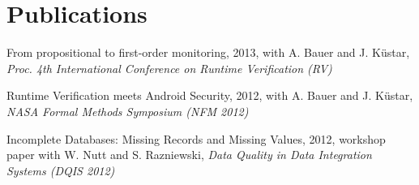 \documentclass[letterpaper]{article}
\renewenvironment{itemize}{
  \begin{list}{}{
    \setlength{\leftmargin}{1.5em}
  }
}{
  \end{list}
}
\begin{document}
\section*{Publications}
\begin{itemize}
\item From propositional to first-order monitoring, 2013, with A. Bauer and J. K\"{u}star, {\it Proc. 4th International Conference on Runtime Verification (RV)}

\item Runtime Verification meets Android Security, 2012, with A. Bauer and J. K\"{u}star, {\it NASA Formal Methods Symposium (NFM 2012)}

\item Incomplete Databases: Missing Records and Missing Values, 2012, workshop paper with W. Nutt and S. Razniewski, {\it Data Quality in Data Integration Systems (DQIS 2012)}
\end{itemize}
\end{document}
